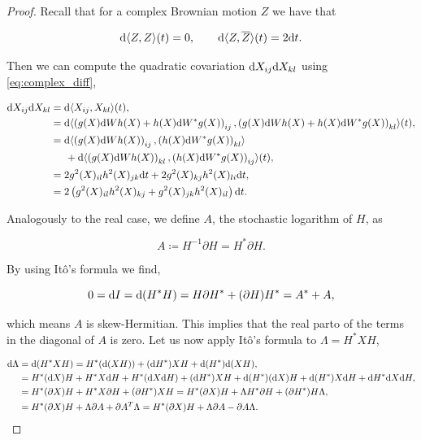 \begin{proof} 
    Recall that for a complex Brownian motion $Z$ we have that

    \[\mathrm d\langle Z,Z\rangle(t) = 0, \qquad \mathrm d \langle Z ,\overline Z\rangle(t) = 2\mathrm d t.\]

    
    Then we can compute the quadratic covariation $\mathrm d X_{ij}\mathrm d X_{kl}$ using \eqref{eq:complex_diff},

    \begin{align*}
        \mathrm d X_{ij}\mathrm d X_{kl} &=  \mathrm d\langle X_{ij},X_{kl} \rangle(t), \\
        &= \mathrm d\langle \left( g(X)\mathrm d  W h(X) + h(X)\mathrm d W^* g(X) \right)_{ij}, \left(g(X)\mathrm d W h(X) + h(X)\mathrm d W^* g(X)\right)_{kl} \rangle(t),\\
        &= \mathrm d\langle \left(g(X)\mathrm d  W h(X)\right)_{ij}, \left(h(X)\mathrm d W^* g(X)\right)_{kl}\rangle \\
        &\phantom{esp}+ \mathrm d\langle \left(g(X)\mathrm d  W h(X)\right)_{kl}, \left(h(X)\mathrm d W^* g(X)\right)_{ij}\rangle(t),\\
        &= 2g^2(X)_{il}h^2(X)_{jk}\mathrm d t + 2g^2(X)_{kj}h^2(X)_{li}\mathrm d t,\\
        &= 2\left( g^2(X)_{il}h^2(X)_{kj} + g^2(X)_{jk}h^2(X)_{il} \right)\mathrm d t.
    \end{align*}


    Analogously to the real case, we define $A$, the stochastic logarithm of $H$, as

    \begin{equation*}
        A \coloneqq H^{-1}\partial H = H^* \partial H.
    \end{equation*}

    By using Itô's formula we find,

    \begin{equation*}
        0 = \mathrm d I = \mathrm d(H^*H) = H \partial H^* + (\partial H) H^* = A^* + A,
    \end{equation*}

    \noindent which means $A$ is skew-Hermitian. This implies that the real parto of the terms in the diagonal of $A$ is zero. Let us now apply Itô's formula to $\Lambda = H^* X H$,

    \begin{align*} %
        \d \Lambda &= \d(H^* X H) = H^*(\d(XH)) + (\d H^*) XH + \d(H^*)\d (XH),\\
        &= H^*(\d X) H + H^* X \d H + H^*(\d X\d H) + (\d H^*)X H + \d(H^*)(\d X)H + \d(H^*)X\d H + \d H^*\d X\d H,\\
        &= H^*(\partial X)H + H^*X\partial H + (\partial H^*)XH = H^*(\partial X)H + \Lambda H^* \partial H + (\partial H^*)H\Lambda,\\
        &= H^*(\partial X)H + \Lambda \partial A + \trans{\partial A}\Lambda = H^*(\partial X)H + \Lambda \partial A - \partial A \Lambda.
    \end{align*}


\end{proof}
